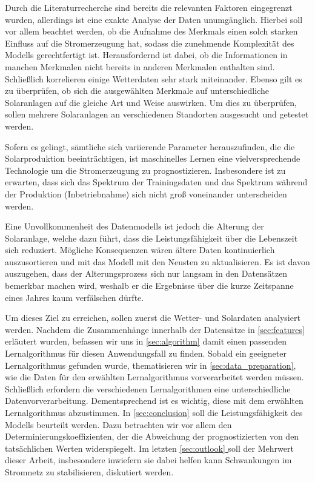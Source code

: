 \documentclass[12pt, a4paper]{article}
\newcommand*{\fullref}[1]{\hyperref[{#1}]{\autoref*{#1} \nameref*{#1}}}
\begin{document}
Durch die Literaturrecherche sind bereits die relevanten Faktoren eingegrenzt wurden, allerdings ist eine exakte Analyse der Daten unumgänglich. Hierbei soll vor allem beachtet werden, ob die Aufnahme des Merkmals einen solch starken Einfluss auf die Stromerzeugung hat, sodass die zunehmende Komplexität des Modells gerechtfertigt ist. Herausfordernd ist dabei, ob die Informationen in manchen Merkmalen nicht bereits in anderen Merkmalen enthalten sind. Schließlich korrelieren einige Wetterdaten sehr stark miteinander. Ebenso gilt es zu überprüfen, ob sich die ausgewählten Merkmale auf unterschiedliche Solaranlagen auf die gleiche Art und Weise auswirken. Um dies zu überprüfen, sollen mehrere Solaranlagen an verschiedenen Standorten ausgesucht und getestet werden.

Sofern es gelingt, sämtliche sich variierende Parameter herauszufinden, die die Solarproduktion beeinträchtigen, ist maschinelles Lernen eine vielversprechende Technologie um die Stromerzeugung zu prognostizieren. Insbesondere ist zu erwarten, dass sich das Spektrum der Trainingsdaten und das Spektrum während der Produktion (Inbetriebnahme) sich nicht groß voneinander unterscheiden werden.

Eine Unvollkommenheit des Datenmodells ist jedoch die Alterung der Solaranlage, welche dazu führt, dass die Leistungsfähigkeit über die Lebenszeit sich reduziert. Mögliche Konsequenzen wären ältere Daten kontinuierlich auszusortieren und mit das Modell mit den Neusten zu aktualisieren. Es ist davon auszugehen, dass der Alterungsprozess sich nur langsam in den Datensätzen bemerkbar machen wird, weshalb er die Ergebnisse über die kurze Zeitspanne eines Jahres kaum verfälschen dürfte.

Um dieses Ziel zu erreichen, sollen zuerst die Wetter- und Solardaten analysiert werden. Nachdem die Zusammenhänge innerhalb der Datensätze in \autoref{sec:features} erläutert wurden, befassen wir uns in \autoref{sec:algorithm} damit einen passenden Lernalgorithmus für diesen Anwendungsfall zu finden. Sobald ein geeigneter Lernalgorithmus gefunden wurde, thematisieren wir in \autoref{sec:data_preparation}, wie die Daten für den erwählten Lernalgorithmus vorverarbeitet werden müssen. Schließlich erfordern die verschiedenen Lernalgorithmen eine unterschiedliche Datenvorverarbeitung. Dementsprechend ist es wichtig, diese mit dem erwählten Lernalgorithmus abzustimmen. In \autoref{sec:conclusion} soll die Leistungsfähigkeit des Modells beurteilt werden. Dazu betrachten wir vor allem den Determinierungskoeffizienten, der die Abweichung der prognostizierten von den tatsächlichen Werten widerspiegelt. Im letzten \fullref{sec:outlook} soll der Mehrwert dieser Arbeit, insbesondere inwiefern sie dabei helfen kann Schwankungen im Stromnetz zu stabilisieren, diskutiert werden.
 
\end{document}
